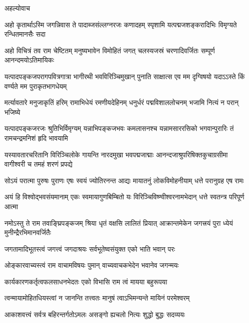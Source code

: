 \centerline{अहल्योवाच}

\fourlineindentedshloka
{अहो कृतार्थाऽस्मि जगन्निवास ते}
{पादाब्जसंल्लग्नरजः कणादहम्}
{स्पृशामि यत्पद्मजशङ्करादिभिः}
{विमृग्यते रन्धितमानसैः सदा}%

\fourlineindentedshloka
{अहो विचित्रं तव राम चेष्टितम्}
{मनुष्यभावेन विमोहितं जगत्}
{चलस्यजस्रं चरणादिवर्जितः}
{सम्पूर्ण आनन्दमयोऽतिमायिकः}%

\fourlineindentedshloka
{यत्पादपङ्कजपरागपवित्रगात्रा}
{भागीरथी भवविरिञ्चिमुखान्  पुनाति}
{साक्षात्स एव मम दृग्विषयो यदाऽऽस्ते}
{किं वर्ण्यते मम पुराकृतभागधेयम्}%

\fourlineindentedshloka
{मर्त्यावतारे मनुजाकृतिं हरिम्}
{रामाभिधेयं रमणीयदेहिनम्}
{धनुर्धरं पद्मविशाललोचनम्}
{भजामि नित्यं न परान्  भजिष्ये}%

\fourlineindentedshloka
{यत्पादपङ्कजरजः श्रुतिभिर्विमृग्यम्}
{यन्नाभिपङ्कजभवः कमलासनश्च}
{यन्नामसाररसिको भगवान्पुरारिः}
{तं  रामचन्द्रमनिशं हृदि भावयामि}%

\fourlineindentedshloka
{यस्यावतारचरितानि विरिञ्चिलोके}
{गायन्ति नारदमुखा भवपद्मजाद्माः}
{आनन्दजाश्रुपरिषिक्तकुचाग्रसीमा}
{वागीश्वरी च तमहं शरणं प्रपद्ये}%

\fourlineindentedshloka
{सोऽयं परात्मा पुरुषः पुराणः}
{एषः स्वयं ज्योतिरनन्त आद्यः}
{मायातनुं लोकविमोहनीयाम्}
{धत्ते परानुग्रह एष रामः}%

\fourlineindentedshloka
{अयं हि विश्वोद्भवसंयमानाम्}
{एकः  स्वमायागुणबिम्बितो यः}
{विरिञ्चिविष्ण्वीश्वरनामभेदान्}
{धत्ते स्वतन्त्र परिपूर्ण आत्मा}%

\fourlineindentedshloka
{नमोऽस्तु ते राम तवाङ्घ्रिपङ्कजम्}
{श्रिया धृतं वक्षसि लालितं प्रियात्}
{आक्रान्तमेकेन जगत्त्रयं पुरा}
{ध्येयं मुनीन्द्रैरभिमानवर्जितैः}%

\twolineshloka
{जगतामादिभूतस्त्वं जगत्त्वं जगदाश्रयः}
{सर्वभूतेष्वसंयुक्त एको भाति भवान् परः}%

\twolineshloka
{ओङ्कारवाच्यस्त्वं राम वाचामविषयः पुमान्}
{वाच्यवाचकभेदेन भवानेव जगन्मयः}%

\twolineshloka
{कार्यकारणकर्तृत्वफलसाधनभेदतः}
{एको विभासि राम त्वं मायया बहुरूपया}%

\twolineshloka
{त्वन्मायामोहितधियस्त्वां न जानन्ति तत्त्वतः}
{मानुषं त्वाऽभिमन्यन्ते मायिनं परमेश्वरम्}%

\twolineshloka
{आकाशवत्त्वं सर्वत्र बहिरन्तर्गतोऽमलः}
{असङ्गो ह्यचलो नित्यः शुद्धो बुद्धः सदव्ययः}%

